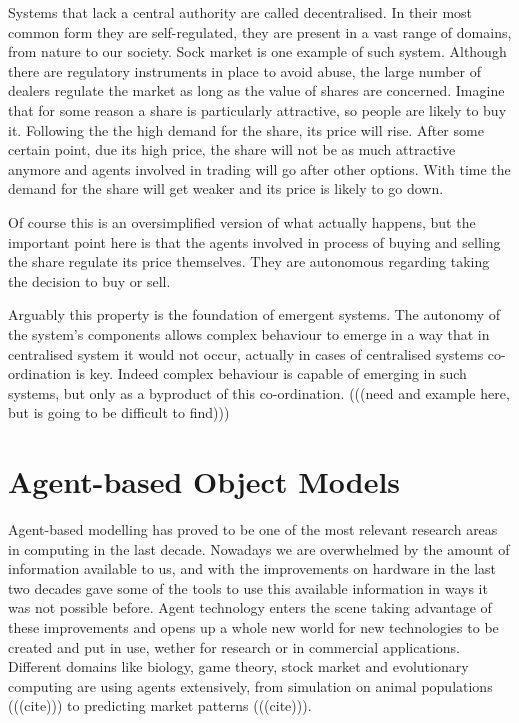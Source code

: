 Systems that lack a central authority are called decentralised. In their most common form they are self-regulated, they are present in a vast range of domains, from nature to our society. Sock market is one example of such system. Although there are regulatory instruments in place to avoid abuse, the large number of dealers regulate the market as long as the value of shares are concerned. Imagine that for some reason a share is particularly attractive, so people are likely to buy it. Following the the high demand for the share, its price will rise. After some certain point, due its high price, the share will not be as much attractive anymore and agents involved in trading will go after other options. With time the demand for the share will get weaker and its price is likely to go down.

Of course this is an oversimplified version of what actually happens, but the important point here is that the agents involved in process of buying and selling the share regulate its price themselves. They are autonomous regarding taking the decision to buy or sell.

Arguably this property is the foundation of emergent systems. The autonomy of the system's components allows complex behaviour to emerge in a way that in centralised system it would not occur, actually in cases of centralised systems co-ordination is key. Indeed complex behaviour is capable of emerging in such systems, but only as a byproduct of this co-ordination. (((need and example here, but is going to be difficult to find)))

\section{Agent-based Object Models}

Agent-based modelling has proved to be one of the most relevant research areas in computing in the last decade. Nowadays we are overwhelmed by the amount of information available to us, and with the improvements on hardware in the last two decades gave some of the tools to use this available information in ways it was not possible before. Agent technology enters the scene taking advantage of these improvements and opens up a whole new world for new technologies to be created and put in use, wether for research or in  commercial applications. Different domains like biology, game theory, stock market and evolutionary computing are using agents extensively, from simulation on animal populations (((cite))) to predicting market patterns (((cite))).

